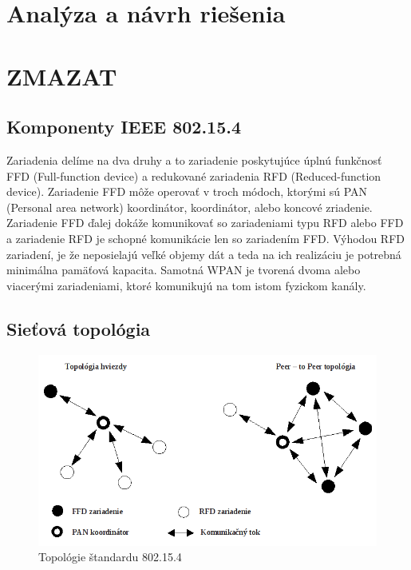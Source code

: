 \documentclass[11pt,twoside,a4paper]{book}
\begin{document}
\chapter{Analýza a návrh riešenia}







\chapter{ZMAZAT}
\section{Komponenty IEEE 802.15.4}
Zariadenia delíme na dva druhy a to zariadenie poskytujúce úplnú funkčnosť FFD (Full-function device) a redukované zariadenia RFD (Reduced-function device). Zariadenie FFD môže operovať v troch módoch, ktorými sú PAN (Personal area network) koordinátor, koordinátor, alebo koncové zriadenie. Zariadenie FFD ďalej dokáže komunikovať so zariadeniami typu RFD alebo FFD a zariadenie RFD je schopné komunikácie len so zariadením FFD. Výhodou RFD zariadení, je že neposielajú veľké objemy dát a teda na ich realizáciu je potrebná minimálna pamäťová kapacita. 
Samotná WPAN je tvorená dvoma alebo viacerými zariadeniami, ktoré komunikujú na tom istom fyzickom kanály.

\newpage 

\section{Sieťová topológia}

\begin{figure}[h]
 \centering
 \includegraphics[width=12cm]{./figures/topologies802154.png}
 \caption{Topológie štandardu 802.15.4}
 \label{fig:80215topologies}
\end{figure}
\end{document}
